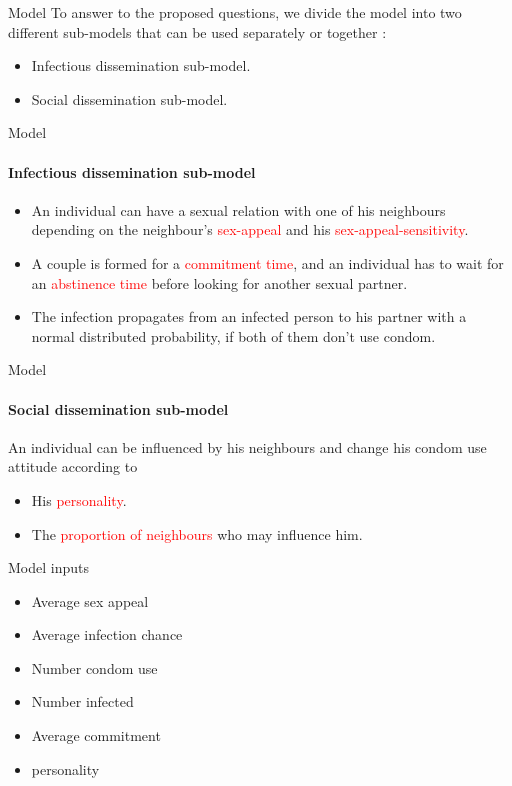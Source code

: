 \documentclass{beamer}
\begin{document}
\begin{frame}{Model}
	To answer to the proposed questions, we divide the model into two different sub-models that can be used separately or together :

	\begin{itemize}
		\item Infectious dissemination sub-model.
		\item Social dissemination sub-model.
	\end{itemize}
\end{frame}

\begin{frame}{Model}
\framesubtitle{\bf{Infectious dissemination sub-model}}
	\begin{itemize}
		\item An individual can have a sexual relation with one of his neighbours depending on the neighbour's \textcolor{red}{sex-appeal}  and his \textcolor{red}{sex-appeal-sensitivity}.
		\item A couple is formed for a \textcolor{red}{commitment time}, and an individual has to wait for an \textcolor{red}{abstinence time} before looking for another sexual partner. 
		\item The infection propagates from an infected person to his partner with a normal distributed probability, if both of them don't use condom.
	\end{itemize}
\end{frame}

\begin{frame}{Model}
\framesubtitle{\bf{Social dissemination sub-model}}
	An individual can be influenced by his neighbours and change his condom use attitude according to 
	\begin{itemize}
		\item His \textcolor{red}{personality}.
		\item The \textcolor{red}{proportion of neighbours} who may influence him.
	\end{itemize}
\end{frame}

\begin{frame}{Model inputs}
	\begin{itemize}
		\item Average sex appeal
		\item Average infection chance
		\item Number condom use
		\item Number infected
		\item Average commitment
		\item personality
	\end{itemize}
\end{frame}
\end{document}
